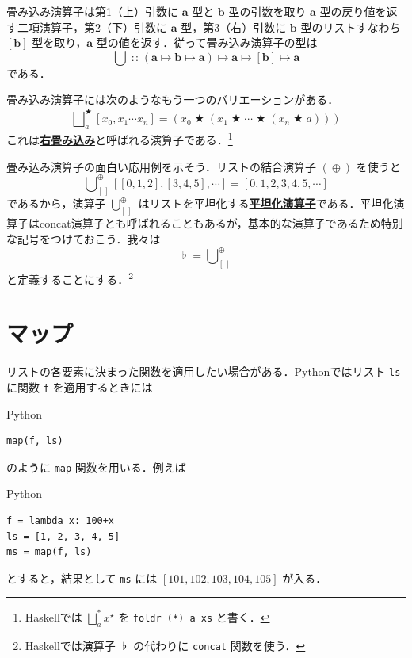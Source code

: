 \documentclass[a4paper,twocolumn]{jsbook}
\newcommand{\programminglanguage}[1]{\textsf{#1}}
\newcommand{\haskell}{\programminglanguage{Haskell}}
\newcommand{\python}{\programminglanguage{Python}}
\newcommand{\keyword}[1]{{\underline{\textbf{#1}}}}
\newcommand{\code}[1]{\texttt{#1}}
\newenvironment{pythoncode}{\begin{itembox}[r]{\python}}{\end{itembox}}
\newcommand{\mEmptyList}{{[\,]}}
\DeclareMathOperator{\mAppend}{\oplus}
\DeclareMathOperator{\mBinOp}{\bigstar}
\DeclareMathOperator{\mConcat}{\flat}
\DeclareMathOperator*{\mFold}{\bigcup}
\DeclareMathOperator*{\mFoldRight}{\bigsqcup}
\DeclareMathOperator{\mIn}{{:\!:}}
\DeclareMathOperator{\mMapsTo}{\mapsto}
\newcommand{\mType}[1]{\mathbf{#1}}
\newcommand{\mListType}[1]{[\mType{#1}]}
\newcommand{\mListWith}[1]{\left[#1\right]}
\newcommand{\mList}[1]{{#1}^\mathrm{\star}}
\newcommand{\mProj}[2]{#1\mMapsTo#2}
\begin{document}
畳み込み演算子は第1（上）引数に $\mType{a}$ 型と $\mType{b}$ 型の引数を取り $\mType{a}$ 型の戻り値を返す二項演算子，第2（下）引数に $\mType{a}$ 型，第3（右）引数に $\mType{b}$ 型のリストすなわち $\mListType{b}$ 型を取り，$\mType{a}$ 型の値を返す．従って畳み込み演算子の型は
\begin{equation}
\mFold
\mIn{}
\mProj{
  (\mProj{\mType{a}}{\mProj{\mType{b}}{\mType{a}}})
}
{
  \mProj{\mType{a}}{\mProj{\mListType{b}}{\mType{a}}}
}
\end{equation}
である．

畳み込み演算子には次のようなもう一つのバリエーションがある．
\begin{equation}
\mFoldRight^{\mBinOp}_{a}\mListWith{x_0,x_1\dotsb x_n}
=(x_0\mBinOp(x_1\mBinOp\dotsb\mBinOp(x_n\mBinOp a)))
\end{equation}
これは\keyword{右畳み込み}と呼ばれる演算子である．\footnote{\haskell では $\mFoldRight^{*}_a\mList{x}$ を \code{foldr (*) a xs} と書く．}

畳み込み演算子の面白い応用例を示そう．リストの結合演算子 $(\mAppend)$ を使うと
\begin{equation}
\mFold_\mEmptyList^{\mAppend}\mListWith{\mListWith{0,1,2},\mListWith{3,4,5},\dotsb}=\mListWith{0,1,2,3,4,5,\dotsb}
\end{equation}
であるから，演算子 $\mFold_\mEmptyList^{\mAppend}$ はリストを平坦化する\keyword{平坦化演算子}である．平坦化演算子はconcat演算子とも呼ばれることもあるが，基本的な演算子であるため特別な記号をつけておこう．我々は
\begin{equation}
\mConcat=\mFold_\mEmptyList^{\mAppend}
\end{equation}
と定義することにする．\footnote{\haskell では演算子 $\mConcat$ の代わりに \code{concat} 関数を使う．}

\section{マップ}

リストの各要素に決まった関数を適用したい場合がある．\python ではリスト \code{ls} に関数 \code{f} を適用するときには
\begin{pythoncode}
\begin{verbatim}
map(f, ls)
\end{verbatim}
\end{pythoncode}
のように \code{map} 関数を用いる．例えば
\begin{pythoncode}
\begin{verbatim}
f = lambda x: 100+x
ls = [1, 2, 3, 4, 5]
ms = map(f, ls)
\end{verbatim}
\end{pythoncode}
とすると，結果として \code{ms} には $\mListWith{101,102,103,104,105}$ が入る．
\end{document}

